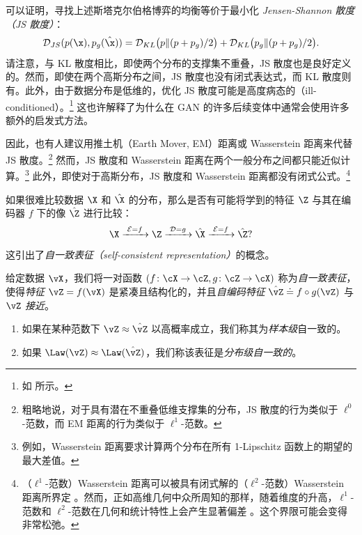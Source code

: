 \documentclass[../../book-main_zh.tex]{subfiles}
\begin{document}
可以证明，寻找上述斯塔克尔伯格博弈的均衡等价于最小化 {\em Jensen-Shannon 散度（JS 散度）}：
\begin{equation}
    \mathcal{D}_{JS}(p(\x), p_g(\hat \x)) = \mathcal{D}_{KL}\big(p \|
    (p + p_g)/{2}\big) + \mathcal{D}_{KL}\big(p_g \| (p + p_g)/{2}\big).
\end{equation}
请注意，与 KL 散度相比，即使两个分布的支撑集不重叠，JS 散度也是良好定义的。然而，即使在两个高斯分布之间，JS 散度也没有闭式表达式，而 KL 散度则有。此外，由于数据分布是低维的，优化 JS 散度可能是高度病态的（ill-conditioned）。\footnote{如 \cite{arjovsky2017wasserstein} 所示。} 这也许解释了为什么在 GAN 的许多后续变体中通常会使用许多额外的启发式方法。

因此，也有人建议用推土机（Earth Mover, EM）距离或 Wasserstein 距离来代替 JS 散度。\footnote{粗略地说，对于具有潜在不重叠低维支撑集的分布，JS 散度的行为类似于 $\ell^0$-范数，而 EM 距离的行为类似于 $\ell^1$-范数。} 然而，JS 散度和 Wasserstein 距离在两个一般分布之间都只能近似计算。\footnote{例如，Wasserstein 距离要求计算两个分布在所有 1-Lipschitz 函数上的期望的最大差值。} 此外，即使对于高斯分布，JS 散度和 Wasserstein 距离都没有闭式公式。\footnote{（$\ell^1$-范数）Wasserstein 距离可以被具有闭式解的（$\ell^2$-范数）Wasserstein 距离所界定 \cite{salmona2021gromovwasserstein}。然而，正如高维几何中众所周知的那样，随着维度的升高，$\ell^1$-范数和 $\ell^2$-范数在几何和统计特性上会产生显著偏差 \cite{Wright-Ma-2022}。这个界限可能会变得非常松弛。}

如果很难比较数据 $\X$ 和 $\hat \X$ 的分布，那么是否有可能将学到的特征 $\Z$ 与其在编码器 $f$ 下的像 $\hat \Z$ 进行比较：
\begin{equation}
    \X
    \xrightarrow{\hspace{1mm} \mathcal{E} = f \hspace{1mm}} \Z
    \xrightarrow{\hspace{1mm} \mathcal{D} = g \hspace{1mm}} \hat{\X}
    \xrightarrow{\hspace{1mm} \mathcal{E} = f \hspace{1mm}} \hat \Z?
    \label{eqn:closed-autoencoding}
\end{equation}
这引出了{\em 自一致表征（self-consistent representation）}的概念。
\begin{definition}[自一致表征]\label{def:closed_loop}
    给定数据 \(\vX\)，我们将一对函数 \((f \colon \cX \to \cZ, g
    \colon \cZ \to \cX)\) 称为\textit{自一致表征}，使得\textit{特征} \(\vZ =
    f(\vX)\) 是紧凑且结构化的，并且\textit{自编码特征} \(\hat{\vZ} \doteq f \circ g(\vZ)\) 与 \(\vZ\) \textit{接近}。
    \begin{enumerate}
        \item 如果在某种范数下 \(\vZ \approx \hat{\vZ}\) 以高概率成立，我们称其为\textit{样本级}自一致的。
        \item 如果 \(\Law(\vZ) \approx \Law(\hat{\vZ})\)，我们称该表征是\textit{分布级自一致的}。
    \end{enumerate}
\end{definition}
\end{document}
